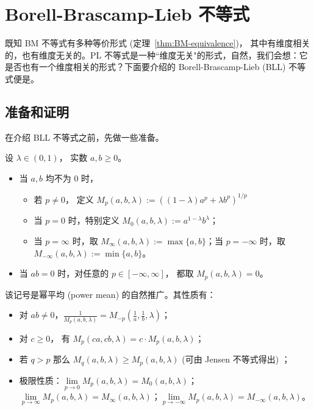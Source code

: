 \section{Borell-Brascamp-Lieb 不等式}

既知 BM 不等式有多种等价形式 (定理~\ref{thm:BM-equivalence})， 其中有维度相关的，也有维度无关的。PL 不等式是一种``维度无关"的形式，自然，我们会想：它是否也有一个维度相关的形式？下面要介绍的 Borell-Brascamp-Lieb (BLL) 不等式便是。

\subsection{准备和证明}

在介绍 BLL 不等式之前，先做一些准备。

\begin{definition}
    
设 $\lambda\in(0,1)$， 实数 $a,b\ge 0$。

\begin{itemize}
\item 当 $a,b$ 均不为 0 时，
\begin{itemize}
\item 若 $p\ne 0$， 定义 $M_p(a,b,\lambda):=((1-\lambda)a^p+\lambda b^p)^{1/p}$
\item 当 $p=0$ 时，特别定义 $M_0(a,b,\lambda):=a^{1-\lambda}b^\lambda$；
\item 当 $p=\infty$ 时，取 $M_\infty(a,b,\lambda):=\max\{a,b\}$；当 $p=-\infty$ 时，取 $M_{-\infty}(a,b,\lambda):=\min\{a,b\}$。
\end{itemize}
\item 当 $ab=0$ 时，对任意的 $p\in[-\infty,\infty]$， 都取 $M_p(a,b,\lambda)=0$。
\end{itemize}
\end{definition}

该记号是幂平均 (power mean) 的自然推广。其性质有：

\begin{itemize}
\item 对 $ab\ne 0$，$\displaystyle \frac1{M_p(a,b,\lambda)}=M_{-p}\left(\frac1a,\frac1b,\lambda\right)$；
\item 对 $c\ge 0$， 有 $M_p(ca,cb,\lambda)=c\cdot M_p(a,b,\lambda)$；
\item 若 $q>p$ 那么 $M_q(a,b,\lambda)\ge M_p(a,b,\lambda)$ (可由 Jensen 不等式得出) ；
\item 极限性质：$\lim\limits_{p\to 0}M_p(a,b,\lambda)=M_0(a,b,\lambda)$；$\lim\limits_{p\to \infty}M_p(a,b,\lambda)=M_\infty(a,b,\lambda)$；$\lim\limits_{p\to -\infty}M_p(a,b,\lambda)=M_{-\infty}(a,b,\lambda)$。
\end{itemize}

